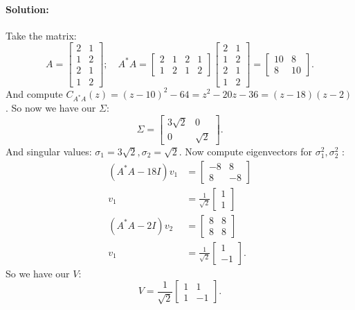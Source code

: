 \documentclass{article}
\begin{document}
\begin{enumerate}
    \paragraph{Solution: }Take the matrix:
    \[ A=\begin{bmatrix} 2&1\\1&2\\2&1\\1&2\end{bmatrix};\quad
    A^* A=\begin{bmatrix} 2&1&2&1\\1&2&1&2 \end{bmatrix}
    \begin{bmatrix} 2&1\\1&2\\2&1\\1&2\end{bmatrix}=
    \begin{bmatrix} 10&8\\8&10 \end{bmatrix} 
.\]
    And compute $C_{A^* A}(z)=(z-10)^2-64=z^2-20z-36=(z-18)(z-2)$.
    So now we have our $\Sigma$:
     \[ \Sigma=\begin{bmatrix} 3\sqrt{2} &0\\0&\sqrt{2}  \end{bmatrix} .\]
    And singular values: $\sigma_1=3\sqrt{2},\sigma_2=\sqrt{2} $. Now compute eigenvectors for $\sigma_1^2,\sigma_2^2$ :
    \begin{align*}
        (A^* A-18I)v_1&= \begin{bmatrix} -8&8\\8&-8 \end{bmatrix}  \\
        v_1&=\frac{1}{\sqrt{2} } \begin{bmatrix} 1\\1 \end{bmatrix}  \\
        (A^* A-2I)v_2&= \begin{bmatrix} 8&8\\8&8 \end{bmatrix}  \\
        v_1&=\frac{1}{\sqrt{2} } \begin{bmatrix} 1\\-1 \end{bmatrix} 
    .\end{align*}
    So we have our $V$:
    \[ V=\frac{1}{\sqrt{2} }\begin{bmatrix} 1&1\\1&-1 \end{bmatrix} .\] 

\end{enumerate}
\end{document}
